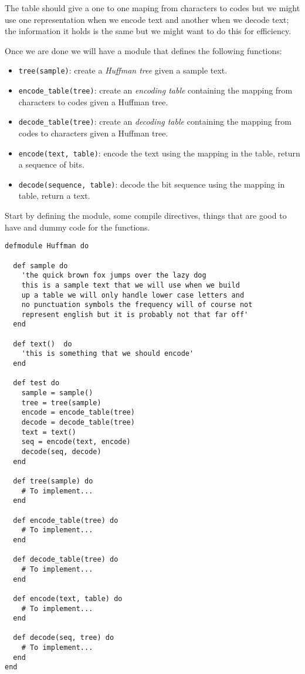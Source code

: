 \documentclass[a4paper,11pt]{article}
\begin{document}
The table should give a one to one maping from characters to codes but
we might use one representation when we encode text and another when
we decode text; the information it holds is the same but we might want
to do this for efficiency.

Once we are done we will have a module that defines the following functions:
\begin{itemize}
    \item {\tt tree(sample)}: create a {\em Huffman tree} given a sample text.
    \item {\tt encode\_table(tree)}: create an {\em encoding table} containing the mapping from characters to codes given a Huffman tree.
    \item {\tt decode\_table(tree)}: create an {\em decoding table} containing the mapping from codes to characters given a Huffman tree.
    \item {\tt encode(text, table)}: encode the text using the mapping in the table, return a sequence of bits.
    \item {\tt decode(sequence, table)}: decode the bit sequence using the mapping in table, return a text.
\end{itemize}

Start by defining the module, some compile directives, things that
are good to have and dummy code for the functions.
\begin{verbatim}
defmodule Huffman do

  def sample do
    'the quick brown fox jumps over the lazy dog
    this is a sample text that we will use when we build
    up a table we will only handle lower case letters and
    no punctuation symbols the frequency will of course not
    represent english but it is probably not that far off'
  end

  def text()  do
    'this is something that we should encode'
  end
  
  def test do
    sample = sample()
    tree = tree(sample)
    encode = encode_table(tree)
    decode = decode_table(tree)
    text = text()
    seq = encode(text, encode)
    decode(seq, decode)
  end
  
  def tree(sample) do
    # To implement...
  end
  
  def encode_table(tree) do
    # To implement...
  end
  
  def decode_table(tree) do
    # To implement...
  end
  
  def encode(text, table) do
    # To implement...
  end
  
  def decode(seq, tree) do
    # To implement...
  end
end
\end{verbatim}
\end{document}
